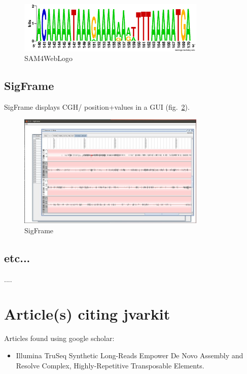 \documentclass{article}
\begin{document}
\begin{figure}[!]
 \includegraphics[width=0.8\textwidth]{sam2weblogo.png}
 \caption{SAM4WebLogo}
 \label{fig:SAM4WebLogo}
\end{figure}

\subsection{SigFrame}
SigFrame displays CGH/ position+values in a GUI (fig.~\ref{fig:SigFrame}).

\begin{figure}[!]
 \includegraphics[width=0.8\textwidth]{sigframe.jpg}
 \caption{SigFrame}
 \label{fig:SigFrame}
\end{figure}


\subsection{etc...}
....


\section{Article(s) citing jvarkit}
Articles found using google scholar: 
\begin{itemize}
\item Illumina TruSeq Synthetic Long-Reads Empower De Novo Assembly and Resolve Complex, Highly-Repetitive Transposable Elements.\cite{ext1}
\end{itemize}
\end{document}
